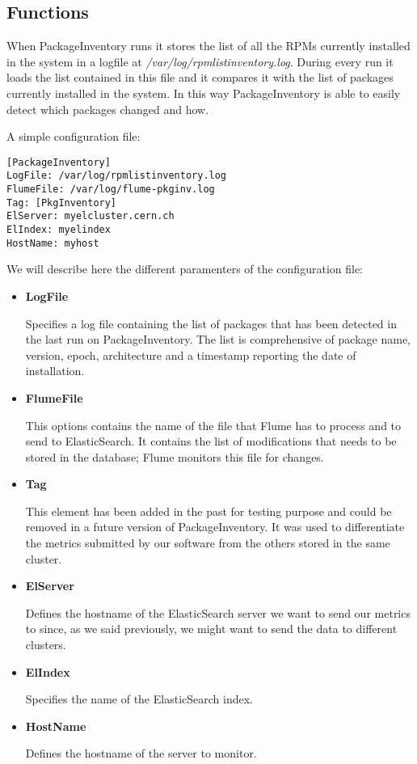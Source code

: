 \subsection{Functions}

When PackageInventory runs it stores the list of all the RPMs currently
installed in the system in a logfile at
\textit{/var/log/rpmlistinventory.log}. During every run it loads the list
contained in this file and it compares it with the list of packages
currently installed in the system. In this way PackageInventory is able to
easily detect which packages changed and how.

A simple configuration file:


\begin{lstlisting}[frame=single]
[PackageInventory]
LogFile: /var/log/rpmlistinventory.log
FlumeFile: /var/log/flume-pkginv.log
Tag: [PkgInventory]
ElServer: myelcluster.cern.ch
ElIndex: myelindex
HostName: myhost
\end{lstlisting}

We will describe here the different paramenters of the configuration file:

\begin{itemize}
  \item \textbf{LogFile}
  
  Specifies a log file containing the list of packages that has been
  detected in the last run on PackageInventory. The list is comprehensive
  of package name, version, epoch, architecture and a timestamp reporting
  the date of installation.
  
  \item \textbf{FlumeFile}

  This options contains the name of the file that Flume has to process and
  to send to ElasticSearch. It contains the list of modifications that
  needs to be stored in the database; Flume monitors this file for
  changes.

  \item \textbf{Tag}

  This element has been added in the past for testing purpose and could be
  removed in a future version of PackageInventory. It was used to
  differentiate the metrics submitted by our software from the others
  stored in the same cluster.

  \item \textbf{ElServer}

  Defines the hostname of the ElasticSearch server we want to send our
  metrics to since, as we said previously, we might want to send the data
  to different clusters.

  \item \textbf{ElIndex}

  Specifies the name of the ElasticSearch index.

  \item \textbf{HostName}

  Defines the hostname of the server to monitor.

\end{itemize}

